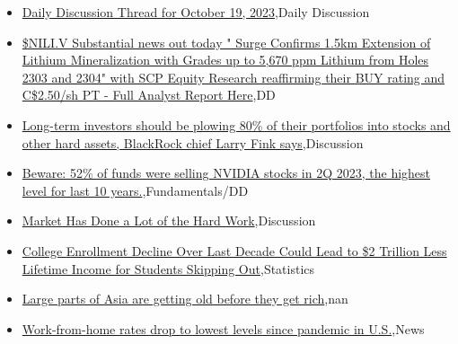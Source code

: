 \documentclass{article}%
\begin{document}
%
\begin{itemize}%
\item%
\href{https://reddit.com/r/wallstreetbets/comments/17bfjvr/daily\_discussion\_thread\_for\_october\_19\_2023/}{Daily Discussion Thread for October 19, 2023},Daily Discussion%
\item%
\href{https://reddit.com/r/Baystreetbets/comments/17ax59x/niliv\_substantial\_news\_out\_today\_surge\_confirms/}{\$NILI.V Substantial news out today " Surge Confirms 1.5km Extension of Lithium Mineralization with Grades up to 5,670 ppm Lithium from Holes 2303 and 2304" with SCP Equity Research reaffirming their BUY rating and C\$2.50/sh PT - Full Analyst Report Here},DD%
\item%
\href{https://reddit.com/r/StockMarket/comments/17b9hq2/longterm\_investors\_should\_be\_plowing\_80\_of\_their/}{Long-term investors should be plowing 80\% of their portfolios into stocks and other hard assets, BlackRock chief Larry Fink says},Discussion%
\item%
\href{https://reddit.com/r/StockMarket/comments/17b47zm/beware\_52\_of\_funds\_were\_selling\_nvidia\_stocks\_in/}{Beware: 52\% of funds were selling NVIDIA stocks in 2Q 2023, the highest level for last 10 years.},Fundamentals/DD%
\item%
\href{https://reddit.com/r/StockMarket/comments/17at88w/market\_has\_done\_a\_lot\_of\_the\_hard\_work/}{Market Has Done a Lot of the Hard Work},Discussion%
\item%
\href{https://reddit.com/r/Economics/comments/17av1fh/college\_enrollment\_decline\_over\_last\_decade\_could/}{College Enrollment Decline Over Last Decade Could Lead to \$2 Trillion Less Lifetime Income for Students Skipping Out},Statistics%
\item%
\href{https://reddit.com/r/Economics/comments/17auj32/large\_parts\_of\_asia\_are\_getting\_old\_before\_they/}{Large parts of Asia are getting old before they get rich},nan%
\item%
\href{https://reddit.com/r/Economics/comments/17asyo4/workfromhome\_rates\_drop\_to\_lowest\_levels\_since/}{Work-from-home rates drop to lowest levels since pandemic in U.S.},News%
\end{itemize}%
\end{document}
